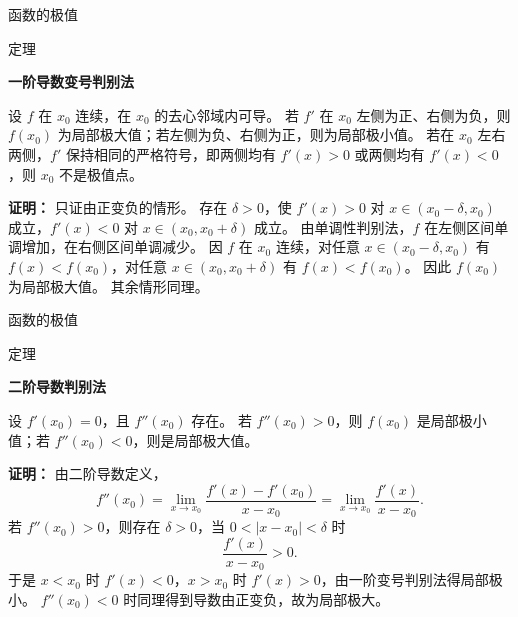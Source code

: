 \documentclass[aspectratio=169,10pt,fontset=fandol]{ctexbeamer}
\begin{document}
\begin{frame}[t,fragile]{函数的极值}
\normalsize
\begin{block}{定理}
{\normalsize
\textbf{一阶导数变号判别法}\par

设 $f$ 在 $x_0$ 连续，在 $x_0$ 的去心邻域内可导。 若 $f'$ 在 $x_0$ 左侧为正、右侧为负，则 $f(x_0)$ 为局部极大值；若左侧为负、右侧为正，则为局部极小值。 若在 $x_0$ 左右两侧，$f'$ 保持相同的严格符号，即两侧均有 $f'(x)>0$ 或两侧均有 $f'(x)<0$，则 $x_0$ 不是极值点。

}
\end{block}
\pause
{\normalsize
\textbf{证明：}
只证由正变负的情形。 存在 $\delta>0$，使 $f'(x)>0$ 对 $x\in(x_0-\delta,x_0)$ 成立，$f'(x)<0$ 对 $x\in(x_0,x_0+\delta)$ 成立。 由单调性判别法，$f$ 在左侧区间单调增加，在右侧区间单调减少。 因 $f$ 在 $x_0$ 连续，对任意 $x\in(x_0-\delta,x_0)$ 有 $f(x)<f(x_0)$，对任意 $x\in(x_0,x_0+\delta)$ 有 $f(x)<f(x_0)$。 因此 $f(x_0)$ 为局部极大值。 其余情形同理。

}
\end{frame}
\begin{frame}[t,fragile]{函数的极值}
\normalsize
\begin{block}{定理}
{\normalsize
\textbf{二阶导数判别法}\par

设 $f'(x_0)=0$，且 $f''(x_0)$ 存在。 若 $f''(x_0)>0$，则 $f(x_0)$ 是局部极小值；若 $f''(x_0)<0$，则是局部极大值。

}
\end{block}
\pause
{\normalsize
\textbf{证明：}
由二阶导数定义，
\[
f''(x_0)=\lim_{x\to x_0}\frac{f'(x)-f'(x_0)}{x-x_0}
=\lim_{x\to x_0}\frac{f'(x)}{x-x_0}.
\]
若 $f''(x_0)>0$，则存在 $\delta>0$，当 $0<|x-x_0|<\delta$ 时
\[
\frac{f'(x)}{x-x_0}>0.
\]
于是 $x<x_0$ 时 $f'(x)<0$，$x>x_0$ 时 $f'(x)>0$，由一阶变号判别法得局部极小。 $f''(x_0)<0$ 时同理得到导数由正变负，故为局部极大。

}
\end{frame}
\end{document}
